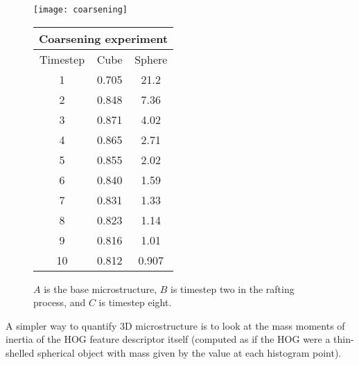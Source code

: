 \documentclass[review]{elsarticle}
\begin{document}
	\begin{figure}[!ht]
    	\begin{center}
			\texttt{[image: coarsening]}
	  		\caption{ $A$ is the base microstructure, $B$ is timestep two in the rafting process, and $C$ is timestep eight. }
	  		\label{figure8}
  		
			\begin{tabular}{ c | c | c }
				\multicolumn{3}{c}{Coarsening experiment} \\
				\hline
				Timestep & Cube & Sphere \\
				\hline
				1 & 0.705 & 21.2 \\
				2 & 0.848 & 7.36 \\
				3 & 0.871 & 4.02 \\
				4 & 0.865 & 2.71 \\
				5 & 0.855 & 2.02 \\
				6 & 0.840 & 1.59 \\
				7 & 0.831 & 1.33 \\
				8 & 0.823 & 1.14 \\
				9 & 0.816 & 1.01 \\
				10 & 0.812 & 0.907 \\
				\hline
			\end{tabular}
			\label{table3}
		\end{center}
	\end{figure}
	
	A simpler way to quantify 3D microstructure is to look at the mass moments of inertia of the HOG feature descriptor itself (computed as if the HOG were a thin-shelled spherical object with mass given by the value at each histogram point).%
	
\end{document}
